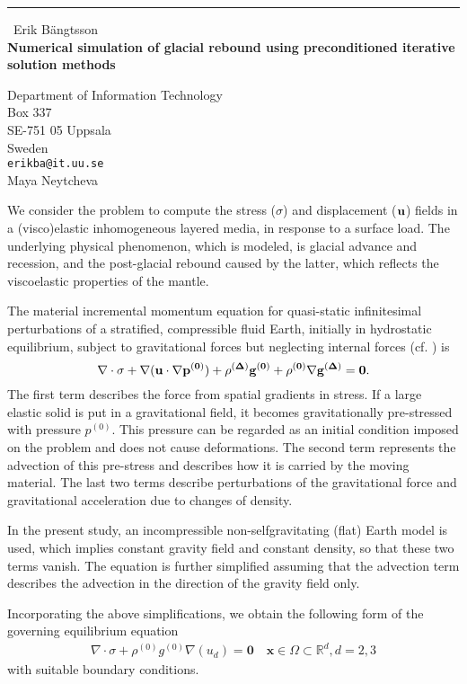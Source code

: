 \documentclass{report}
\begin{document}
\begin{center}
\rule{6in}{1pt} \
{\large Erik B{\"a}ngtsson \\
{\bf Numerical simulation of glacial rebound using preconditioned iterative solution methods}}

Department of Information Technology \\ Box 337 \\ SE-751 05 Uppsala \\ Sweden
\\
{\tt erikba@it.uu.se}\\
Maya Neytcheva\end{center}

We consider the problem to compute the stress ($\sigma$) and
displacement ($\bf{u}$) fields in a (visco)elastic inhomogeneous layered
media, in response to a surface load. The underlying physical phenomenon,
which is modeled, is glacial advance and recession, and the post-glacial
rebound caused by the latter, which reflects the viscoelastic properties
of the mantle.

The material incremental momentum equation for quasi-static infinitesimal
perturbations of a stratified, compressible fluid Earth, initially in
hydrostatic equilibrium, subject to gravitational forces but neglecting
internal forces (cf. \cite{KlemannWuWolf}) is
\[
\nabla \cdot \sigma + \nabla(\bf{u}\cdot\nabla
p^{(0)})+\rho^{(\Delta)}\bf{g}^{(0)} + \rho^{(0)}\nabla\bf{g}^{(\Delta)}
= \bf{0}.
\]
The first term describes the force from spatial gradients in
stress. If a large elastic solid is put in a gravitational field, it
becomes gravitationally pre-stressed with pressure $p^{(0)}$. This
pressure can be regarded as an initial condition imposed on the problem
and does not cause deformations. The second term represents the advection
of this pre-stress and describes how it is carried by the moving
material. The last two terms describe perturbations of the
gravitational force and gravitational acceleration due to changes of density.

In the present study, an incompressible non-selfgravitating (flat) Earth
model is used, which implies constant gravity field and constant density,
so that these two terms vanish. The equation is further simplified
assuming that the advection term describes the advection in the direction
of the gravity field only.

Incorporating the above simplifications, we obtain the following form of
the governing equilibrium equation
\begin{equation}\begin{array}{l}
\nabla\cdot \sigma +
\rho^{(0)}g^{(0)} \nabla(u_d) = \mathbf{0} \quad
\mathbf{x}\in\Omega\subset\mathbb{R}^d, d=2,3
\end{array}\label{eq_rebound2}
\end{equation}
with suitable boundary conditions.
\end{document}
